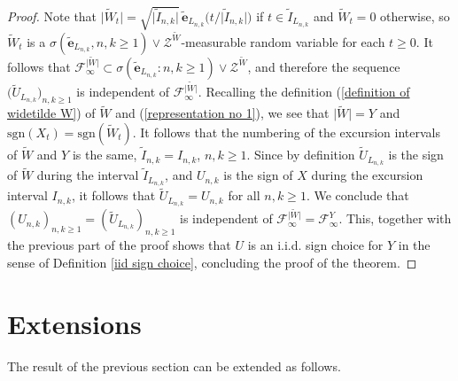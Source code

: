 \documentclass[reqno]{amsart}
\theoremstyle{definition}
\theoremstyle{remark}
\numberwithin{equation}{section}
\begin{document}
\begin{proof}
Note that $\big\vert \widetilde{W}_t\big\vert=\sqrt{\vert \widetilde{I}_{n,k}\vert} \, \widetilde{\mathbf{e}}_{L_{n,k}}\big( t\slash {\vert \widetilde{I}_{n,k}\vert}\big)$ if $t\in \widetilde{I}_{L_{n,k}}$ and $\widetilde{W}_t=0$ otherwise, so $\widetilde{W}_t$ is a $\sigma(\widetilde{\textbf{e}}_{L_{n,k}}, n,k\ge 1)\vee  \mathcal{Z}^{\widetilde{W}}$-measurable random variable for each $t\ge 0$. It follows that $\mathcal{F}^{\vert \widetilde{W}\vert}_\infty \subset\sigma(\widetilde{\textbf{e}}_{L_{n,k}}: n,k\ge 1)\vee  \mathcal{Z}^{\widetilde{W}}$, and therefore the sequence $\big( \widetilde{U}_{L_{n,k}}\big)_{n,k\ge 1}$ is independent of $\mathcal{F}^{\vert \widetilde{W}\vert}_\infty$. Recalling the definition (\ref{definition of widetilde W}) of $\widetilde{W}$ and (\ref{representation no 1}), we see that $\vert \widetilde{W}\vert=Y$ and $\mathrm{sgn}(X_t)=\mathrm{sgn}(\widetilde{W}_t)$. It follows that the numbering of the excursion intervals of $\widetilde{W}$ and $Y$ is the same, $\widetilde{I}_{n,k}=I_{n,k}$, $n,k\ge 1$. Since by definition $\widetilde{U}_{L_{n,k}}$ is the sign of $\widetilde{W}$ during the interval $\widetilde{I}_{L_{n,k}}$, and $U_{n,k}$ is the sign of $X$ during the excursion interval $I_{n,k}$, it follows that $\widetilde{U}_{L_{n,k}}=U_{n,k}$ for all $n,k\ge 1$. We conclude that $(U_{n,k})_{n,k\ge 1}=(\widetilde{U}_{L_{n,k}})_{n,k\ge 1}$ is independent of $\mathcal{F}^{\vert \widetilde{W}\vert}_\infty=\mathcal{F}^{Y}_\infty$. This, together with the previous part of the proof shows that $U$ is an i.i.d.  sign choice for $Y$ in the sense of Definition \ref{iid sign choice}, concluding the proof of the theorem.
\end{proof}

\section{Extensions\label{Section 2}}

The result of the previous section can be extended as follows.
\end{document}

